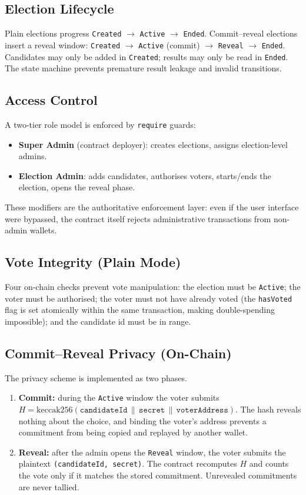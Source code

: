\documentclass[11pt]{article}
\begin{document}
\subsection{Election Lifecycle}
Plain elections progress \texttt{Created} $\rightarrow$ \texttt{Active} $\rightarrow$
\texttt{Ended}. Commit--reveal elections insert a reveal window:
\texttt{Created} $\rightarrow$ \texttt{Active} (commit) $\rightarrow$ \texttt{Reveal}
$\rightarrow$ \texttt{Ended}. Candidates may only be added in \texttt{Created}; results may
only be read in \texttt{Ended}. The state machine prevents premature result leakage and
invalid transitions.

\subsection{Access Control}
A two-tier role model is enforced by \texttt{require} guards:
\begin{itemize}[nosep]
  \item \textbf{Super Admin} (contract deployer): creates elections, assigns election-level admins.
  \item \textbf{Election Admin}: adds candidates, authorises voters, starts/ends the election, opens the reveal phase.
\end{itemize}
These modifiers are the authoritative enforcement layer: even if the user interface were
bypassed, the contract itself rejects administrative transactions from non-admin wallets.

\subsection{Vote Integrity (Plain Mode)}
Four on-chain checks prevent vote manipulation: the election must be \texttt{Active}; the
voter must be authorised; the voter must not have already voted (the \texttt{hasVoted} flag
is set atomically within the same transaction, making double-spending impossible); and the
candidate id must be in range.

\subsection{Commit--Reveal Privacy (On-Chain)}
The privacy scheme is implemented as two phases.
\begin{enumerate}[nosep]
  \item \textbf{Commit:} during the \texttt{Active} window the voter submits
  $H = \mathrm{keccak256}(\texttt{candidateId} \,\|\, \texttt{secret} \,\|\,
  \texttt{voterAddress})$. The hash reveals nothing about the choice, and binding the
  voter's address prevents a commitment from being copied and replayed by another wallet.
  \item \textbf{Reveal:} after the admin opens the \texttt{Reveal} window, the voter submits
  the plaintext \texttt{(candidateId, secret)}. The contract recomputes $H$ and counts the
  vote only if it matches the stored commitment. Unrevealed commitments are never tallied.
\end{enumerate}
\end{document}
